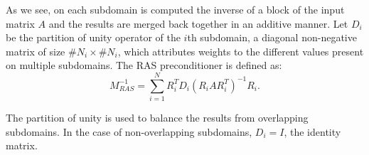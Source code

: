 As we see, on each subdomain is computed the inverse of a block of the input matrix \(A\) and the results are merged back together in an additive manner.
Let \(D_i\) be the partition of unity operator of the \(i\)th subdomain, a diagonal non-negative matrix of size \(\#N_i \times \#N_i\), which attributes weights to the different values present on multiple subdomains.
The RAS preconditioner is defined as:
\[M^{-1}_{RAS} = \sum^N_{i=1} R_i^T D_i (R_i A R_i^T)^{-1} R_i.\]

The partition of unity is used to balance the results from overlapping subdomains.
In the case of non-overlapping subdomains, \(D_i = I\), the identity matrix.
